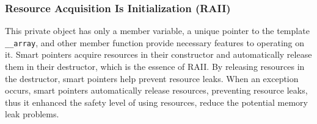 \subsubsection{Resource Acquisition Is Initialization (RAII)}\label{SEC:RAII}
This private object has only a member variable, a unique pointer to the template \texttt{\_\_array}, 
and other member function provide necessary features to operating on it.
Smart pointers acquire resources in their constructor and automatically release them in their destructor, 
which is the essence of RAII. 
By releasing resources in the destructor, smart pointers help prevent resource leaks.
When an exception occurs, smart pointers automatically release resources, preventing resource leaks,
thus it enhanced the safety level of using resources, reduce the potential memory leak problems.


